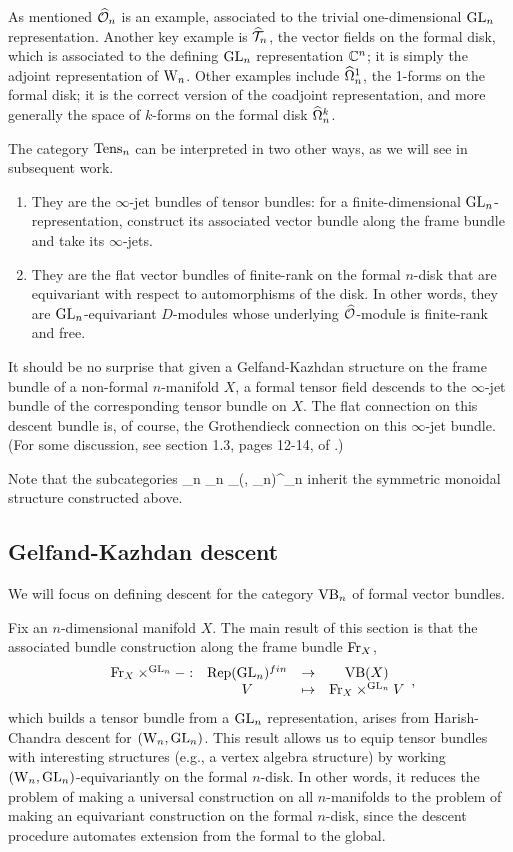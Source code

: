 As mentioned $\widehat{\mathcal O}_n$ is an example, associated to the trivial one-dimensional ${\rm GL}_n$ representation.
Another key example is $\widehat{\mathcal T}_n$, the vector fields on the formal disk, which is associated to the defining ${\rm GL}_n$ representation $\mathbb C^n$; 
it is simply the adjoint representation of ${{\rm W}_n}$.
Other examples include $\widehat{\Omega}^1_n$, the 1-forms on the formal disk; it
is the correct version of the coadjoint representation, and more
generally the space of $k$-forms on the formal disk $\widehat{\Omega}^k_n$. 

The category ${\rm Tens}_n$ can be interpreted in two other ways, as we will see in subsequent work.
\begin{enumerate}
\item They are the $\infty$-jet bundles of tensor bundles: for a finite-dimensional ${\rm GL}_n$-representation, 
construct its associated vector bundle along the frame bundle and take its $\infty$-jets.
\item They are the flat vector bundles of finite-rank on the formal $n$-disk that are equivariant with respect to automorphisms of the disk. 
In other words, they are ${\rm GL}_n$-equivariant $D$-modules whose underlying $\widehat{\mathcal O}$-module is finite-rank and free.
\end{enumerate}
It should be no surprise that given a Gelfand-Kazhdan structure on the frame bundle of a non-formal $n$-manifold $X$, 
a formal tensor field descends to the $\infty$-jet bundle of the corresponding tensor bundle on $X$. 
The flat connection on this descent bundle is, of course, the Grothendieck connection on this $\infty$-jet bundle. 
(For some discussion, see section 1.3, pages 12-14, of \cite{Fuks}.)

Note that the subcategories 
\ben
\Tens_n \hookrightarrow \VB_n
\hookrightarrow \Mod_{(\Vect, \GL_n)}^{\cO_n}
\een
inherit the symmetric monoidal structure constructed above. 

\subsection{Gelfand-Kazhdan descent}

We will focus on defining descent for the category ${\rm VB}_n$ of formal vector
bundles. 

Fix an $n$-dimensional manifold $X$.
The main result of this section is that the associated bundle construction along the frame bundle ${\rm Fr}_X$,
\[
\begin{array}{cccc}
{\rm Fr}_X \times^{{\rm GL}_n} - :&  {\rm Rep}({\rm GL}_n)^{fin} & \to &{\rm VB}(X)\\
& V & \mapsto & {\rm Fr}_X \times^{{\rm GL}_n} V
\end{array},
\]
which builds a tensor bundle from a ${\rm GL}_n$ representation, arises from Harish-Chandra descent for $({{\rm W}_n},{\rm GL}_n)$. 
This result allows us to equip tensor bundles with interesting structures (e.g., a vertex algebra structure) by working $({{\rm W}_n},{\rm GL}_n)$-equivariantly on the formal $n$-disk.
In other words, it reduces the problem of making a universal
construction on all $n$-manifolds to the problem of making an
equivariant construction on the formal $n$-disk,
since the descent procedure automates extension from the formal to the global.

